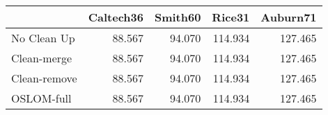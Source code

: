 \begin{tabular}{lrrrr}
\toprule
{} & Caltech36 & Smith60 &  Rice31 & Auburn71 \\
\midrule
No Clean Up  &    88.567 &  94.070 & 114.934 &  127.465 \\
Clean-merge  &    88.567 &  94.070 & 114.934 &  127.465 \\
Clean-remove &    88.567 &  94.070 & 114.934 &  127.465 \\
OSLOM-full   &    88.567 &  94.070 & 114.934 &  127.465 \\
\bottomrule
\end{tabular}
